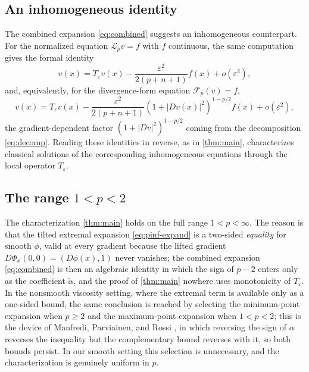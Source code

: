 \documentclass[12pt,reqno]{amsart}
\numberwithin{equation}{section}
\theoremstyle{plain}
\theoremstyle{definition}
\theoremstyle{remark}
\newcommand{\talpha}{\widetilde\alpha}
\newcommand{\Reg}{\mathcal{F}}
\newcommand{\Lp}{\mathcal L_p}
\begin{document}
\subsection*{An inhomogeneous identity}
The combined expansion \eqref{eq:combined} suggests an inhomogeneous
counterpart. For the normalized equation $\Lp v=f$ with $f$ continuous, the
same computation gives the formal identity
\[
  v(x)=T_\varepsilon v(x)-\frac{\varepsilon^2}{2(p+n+1)}f(x)+o(\varepsilon^2),
\]
and, equivalently, for the divergence-form equation $\Reg_p(v)=f$,
\[
  v(x)=T_\varepsilon v(x)
       -\frac{\varepsilon^2}{2(p+n+1)}(1+|Dv(x)|^2)^{1-p/2}f(x)
       +o(\varepsilon^2),
\]
the gradient-dependent factor $(1+|Dv|^2)^{1-p/2}$ coming from the
decomposition \eqref{eq:decomp}. Reading these identities in reverse, as in
\cref{thm:main}, characterizes classical solutions of the corresponding
inhomogeneous equations through the local operator $T_\varepsilon$.

\subsection*{The range \texorpdfstring{$1<p<2$}{1<p<2}}
The characterization \cref{thm:main} holds on the full range
$1<p<\infty$. The reason is that the tilted extremal expansion
\eqref{eq:pinf-expand} is a two-sided \emph{equality} for smooth $\phi$,
valid at every gradient because the lifted gradient
$D\Phi_x(0,0)=(D\phi(x),1)$ never vanishes; the combined expansion
\eqref{eq:combined} is then an algebraic identity in which the sign of
$p-2$ enters only as the coefficient $\talpha$, and the proof of
\cref{thm:main} nowhere uses monotonicity of $T_\varepsilon$. In the
nonsmooth viscosity setting, where the extremal term is available only as
a one-sided bound, the same conclusion is reached by selecting the
minimum-point expansion when $p\ge2$ and the maximum-point expansion when
$1<p<2$; this is the device of Manfredi, Parviainen, and Rossi
\cite{MPRparabolic}, in which reversing the sign of $\alpha$ reverses the
inequality but the complementary bound reverses with it, so both bounds
persist. In our smooth setting this selection is unnecessary, and the
characterization is genuinely uniform in $p$.
\end{document}
